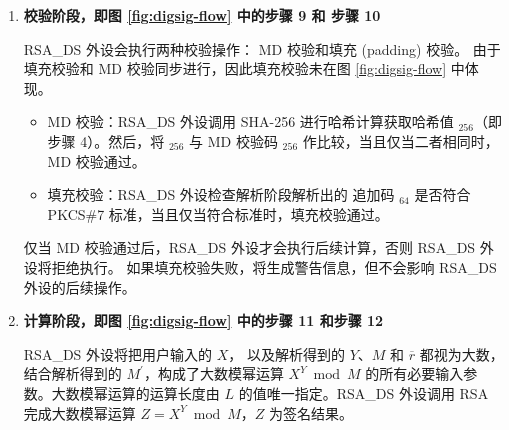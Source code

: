 \documentclass[main\_\_CN.tex]{subfiles}
\begin{document}
\begin{enumerate}
    \item {\bfseries 校验阶段，即图 \ref{fig:digsig-flow} 中的步骤 9 和 步骤 10}

        RSA\_DS 外设会执行两种校验操作： MD 校验和填充 (padding) 校验。
        由于填充校验和 MD 校验同步进行，因此填充校验未在图 \ref{fig:digsig-flow} 中体现。


        \begin{itemize}

            \item MD 校验：RSA\_DS 外设调用 SHA-256 进行哈希计算获取哈希值 \begin{math}[CALC\_MD]_{256}\end{math}（即步骤 4）。然后，将 \begin{math}[CALC\_MD]_{256}\end{math} 与 MD 校验码 \begin{math}[MD]_{256}\end{math} 作比较，当且仅当二者相同时，MD 校验通过。

            \item 填充校验：RSA\_DS 外设检查解析阶段解析出的 追加码 \begin{math}[\beta]_{64} \end{math} 是否符合 PKCS\#7 标准，当且仅当符合标准时，填充校验通过。

        \end{itemize}

        仅当 MD 校验通过后，RSA\_DS 外设才会执行后续计算，否则 RSA\_DS 外设将拒绝执行。
        如果填充校验失败，将生成警告信息，但不会影响 RSA\_DS 外设的后续操作。

    \item {\bfseries 计算阶段，即图 \ref{fig:digsig-flow} 中的步骤 11 和步骤 12}

        RSA\_DS 外设将把用户输入的 \begin{math}X\end{math}，
        以及解析得到的 \begin{math}Y\end{math}、\begin{math}M\end{math} 和 \begin{math}\overline{r}\end{math} 都视为大数，结合解析得到的 \begin{math}M^{\prime}\end{math}，构成了大数模幂运算 \begin{math} X^{Y} \bmod M\end{math} 的所有必要输入参数。大数模幂运算的运算长度由 \begin{math}L\end{math} 的值唯一指定。RSA\_DS 外设调用 RSA 完成大数模幂运算 \begin{math}Z = X^{Y} \bmod M\end{math}，\begin{math}Z\end{math} 为签名结果。

\end{enumerate}
\end{document}
